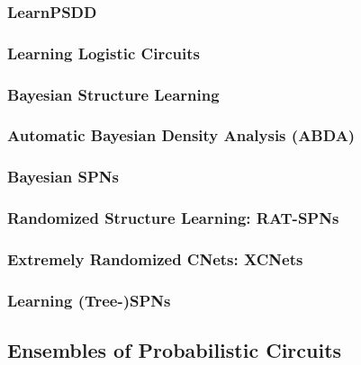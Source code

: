 			\subsubsection{LearnPSDD} %

			\subsubsection{Learning Logistic Circuits} %

			\subsubsection{Bayesian Structure Learning} %

			\subsubsection{Automatic Bayesian Density Analysis (ABDA)} %

			\subsubsection{Bayesian SPNs} %

			\subsubsection{Randomized Structure Learning: RAT-SPNs} %

			\subsubsection{Extremely Randomized CNets: XCNets} %

			\subsubsection{Learning (Tree-)SPNs} %

		\subsection{Ensembles of Probabilistic Circuits} %

